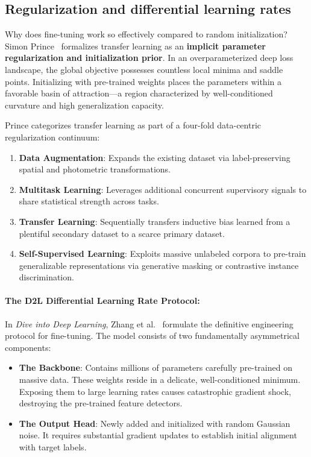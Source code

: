 \subsection{Regularization and differential learning rates}
\label{sec:differential_lr_d2l}

Why does fine-tuning work so effectively compared to random initialization? Simon Prince~\cite{prince2023understanding} formalizes transfer learning as an \textbf{implicit parameter regularization and initialization prior}. In an overparameterized deep loss landscape, the global objective possesses countless local minima and saddle points. Initializing with pre-trained weights places the parameters within a favorable basin of attraction—a region characterized by well-conditioned curvature and high generalization capacity. 

Prince categorizes transfer learning as part of a four-fold data-centric regularization continuum:
\begin{enumerate}[noitemsep,topsep=2pt,parsep=0pt,partopsep=0pt]
  \item \textbf{Data Augmentation}: Expands the existing dataset via label-preserving spatial and photometric transformations.
  \item \textbf{Multitask Learning}: Leverages additional concurrent supervisory signals to share statistical strength across tasks.
  \item \textbf{Transfer Learning}: Sequentially transfers inductive bias learned from a plentiful secondary dataset to a scarce primary dataset.
  \item \textbf{Self-Supervised Learning}: Exploits massive unlabeled corpora to pre-train generalizable representations via generative masking or contrastive instance discrimination.
\end{enumerate}

\paragraph{The D2L Differential Learning Rate Protocol:}
In \textit{Dive into Deep Learning}, Zhang et al.~\cite{zhang2023dive} formulate the definitive engineering protocol for fine-tuning. The model consists of two fundamentally asymmetrical components:
\begin{itemize}[leftmargin=*]
  \item \textbf{The Backbone}: Contains millions of parameters carefully pre-trained on massive data. These weights reside in a delicate, well-conditioned minimum. Exposing them to large learning rates causes catastrophic gradient shock, destroying the pre-trained feature detectors.
  \item \textbf{The Output Head}: Newly added and initialized with random Gaussian noise. It requires substantial gradient updates to establish initial alignment with target labels.
\end{itemize}

